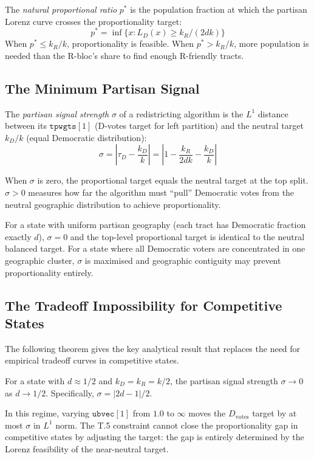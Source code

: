 \begin{definition}
The \emph{natural proportional ratio} $p^*$ is the population fraction at which
the partisan Lorenz curve crosses the proportionality target:
\[
  p^* = \inf\{x : L_D(x) \geq k_R/(2dk)\}
\]
When $p^* \leq k_R/k$, proportionality is feasible. When $p^* > k_R/k$,
more population is needed than the R-bloc's share to find enough R-friendly tracts.
\end{definition}

\subsection{The Minimum Partisan Signal}

\begin{definition}
The \emph{partisan signal strength} $\sigma$ of a redistricting algorithm is the
$L^1$ distance between its $\mathtt{tpwgts}[1]$ (D-votes target for left partition)
and the neutral target $k_D/k$ (equal Democratic distribution):
\[
  \sigma = \left|\tau_D - \frac{k_D}{k}\right| = \left|1 - \frac{k_R}{2dk} - \frac{k_D}{k}\right|
\]
\end{definition}

When $\sigma$ is zero, the proportional target equals the neutral target at the
top split.
$\sigma > 0$ measures how far the algorithm must ``pull'' Democratic votes
from the neutral geographic distribution to achieve proportionality.

\begin{proposition}
For a state with uniform partisan geography (each tract has Democratic fraction
exactly $d$), $\sigma = 0$ and the top-level proportional target is identical
to the neutral balanced target.
For a state where all Democratic voters are concentrated in one geographic cluster,
$\sigma$ is maximised and geographic contiguity may prevent proportionality entirely.
\end{proposition}

\subsection{The Tradeoff Impossibility for Competitive States}

The following theorem gives the key analytical result that replaces the need
for empirical tradeoff curves in competitive states.

\begin{theorem}
\label{thm:invariance}
For a state with $d \approx 1/2$ and $k_D = k_R = k/2$, the partisan signal
strength $\sigma \to 0$ as $d \to 1/2$.
Specifically, $\sigma = |2d - 1| / 2$.

In this regime, varying $\mathtt{ubvec}[1]$ from $1.0$ to $\infty$ moves the
$D_{\text{votes}}$ target by at most $\sigma$ in $L^1$ norm.
The T.5 constraint cannot close the proportionality gap in competitive states
by adjusting the target: the gap is entirely determined by the Lorenz
feasibility of the near-neutral target.
\end{theorem}

